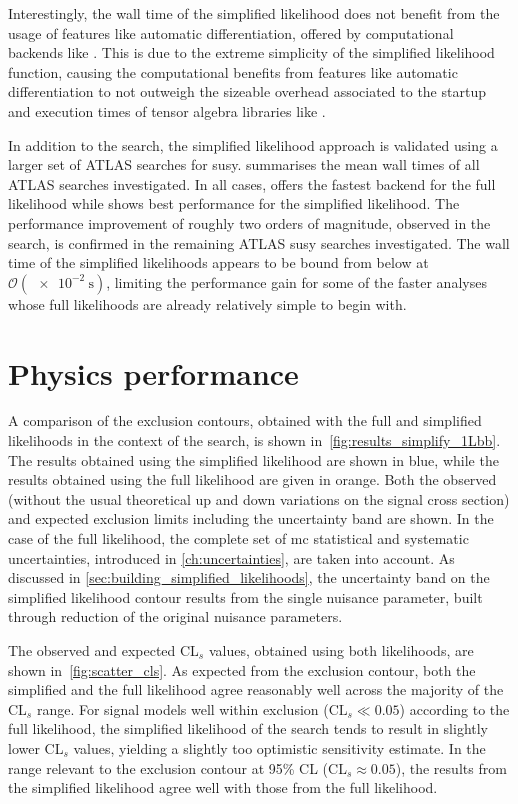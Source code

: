 Interestingly, the wall time of the simplified likelihood does not benefit from the usage of features like automatic differentiation, offered by computational backends like .
This is due to the extreme simplicity of the simplified likelihood function, causing the computational benefits from features like automatic differentiation to not outweigh the sizeable overhead associated to the startup and execution times of tensor algebra libraries like .

In addition to the \onelepton search, the simplified likelihood approach is validated using a larger set of ATLAS searches for \gls{susy}.  summarises the mean wall times of all ATLAS searches investigated.
In all cases,  offers the fastest backend for the full likelihood while  shows best performance for the simplified likelihood.
The performance improvement of roughly two orders of magnitude, observed in the \onelepton search, is confirmed in the remaining ATLAS \gls{susy} searches investigated.
The wall time of the simplified likelihoods appears to be bound from below at $\mathcal{O}(\SI{e-2}{\second})$, limiting the performance gain for some of the faster analyses whose full likelihoods are already relatively simple to begin with.


\section{Physics performance}\label{sec:physics_performance}

A comparison of the exclusion contours, obtained with the full and simplified likelihoods in the context of the \onelepton search, is shown in~\cref{fig:results_simplify_1Lbb}.
The results obtained using the simplified likelihood are shown in blue, while the results obtained using the full likelihood are given in orange.
Both the observed (without the usual theoretical up and down variations on the signal cross section) and expected exclusion limits including the uncertainty band are shown.
In the case of the full likelihood, the complete set of \gls{mc} statistical and systematic uncertainties, introduced in \cref{ch:uncertainties}, are taken into account.
As discussed in \cref{sec:building_simplified_likelihoods}, the uncertainty band on the simplified likelihood contour results from the single nuisance parameter, built through reduction of the original nuisance parameters.

The observed and expected CL$_s$ values, obtained using both likelihoods, are shown in~\cref{fig:scatter_cls}.
As expected from the exclusion contour, both the simplified and the full likelihood agree reasonably well across the majority of the CL$_s$ range.
For signal models well within exclusion (\ie $\mathrm{CL}_s \ll 0.05$) according to the full likelihood, the simplified likelihood of the \onelepton search tends to result in slightly lower CL$_s$ values, yielding a slightly too optimistic sensitivity estimate.
In the range relevant to the exclusion contour at 95\% CL (\ie CL$_s\approx0.05$), the results from the simplified likelihood agree well with those from the full likelihood.

